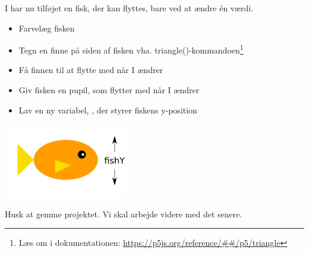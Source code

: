 \documentclass{ucph-handout}
\begin{document}
\begin{exercisebox}[adjusted title=Opgaver]
\noindent
I har nu tilføjet en fisk, der kan flyttes, bare ved at ændre én
værdi.

\begin{itemize}
\item Farvelæg fisken

\item Tegn en finne på siden af fisken vha. triangle()-kommandoen\footnote{Læs om  i dokumentationen: \url{https://p5js.org/reference/##/p5/triangle}}

\item Få finnen til at flytte med når I ændrer 

\item Giv fisken en pupil, som flytter med når I ændrer 
  
\item Lav en ny variabel, , der styrer fiskens y-position
\end{itemize}
\hspace{1cm}\includegraphics[width=0.4\textwidth]{../illustrations/images/fisk-fishY.png}

\noindent
Husk at gemme projektet. Vi skal arbejde videre med det senere.

\end{exercisebox}
\newpage
\end{document}
